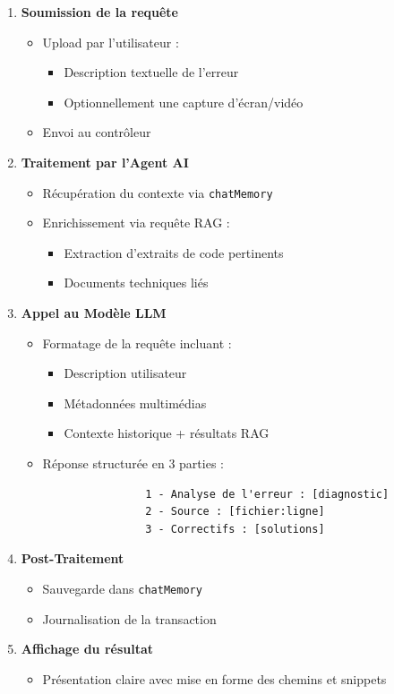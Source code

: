 \documentclass[12pt,a4paper]{report}
\begin{document}
	\begin{enumerate}
		\item \textbf{Soumission de la requête}
		\begin{itemize}
			\item Upload par l'utilisateur :
			\begin{itemize}
				\item Description textuelle de l'erreur
				\item Optionnellement une capture d'écran/vidéo
			\end{itemize}
			\item Envoi au contrôleur
		\end{itemize}
		
		\item \textbf{Traitement par l'Agent AI}
		\begin{itemize}
			\item Récupération du contexte via \texttt{chatMemory}
			\item Enrichissement via requête RAG :
			\begin{itemize}
				\item Extraction d'extraits de code pertinents
				\item Documents techniques liés
			\end{itemize}
		\end{itemize}
		
		\item \textbf{Appel au Modèle LLM}
		\begin{itemize}
			\item Formatage de la requête incluant :
			\begin{itemize}
				\item Description utilisateur
				\item Métadonnées multimédias
				\item Contexte historique + résultats RAG
			\end{itemize}
			\item Réponse structurée en 3 parties :
			\begin{verbatim}
				1 - Analyse de l'erreur : [diagnostic]
				2 - Source : [fichier:ligne]
				3 - Correctifs : [solutions]
			\end{verbatim}
		\end{itemize}
		
		\item \textbf{Post-Traitement}
		\begin{itemize}
			\item Sauvegarde dans \texttt{chatMemory}
			\item Journalisation de la transaction
		\end{itemize}
		
		\item \textbf{Affichage du résultat}
		\begin{itemize}
			\item Présentation claire avec mise en forme des chemins et snippets
		\end{itemize}
	\end{enumerate}
	
\end{document}
